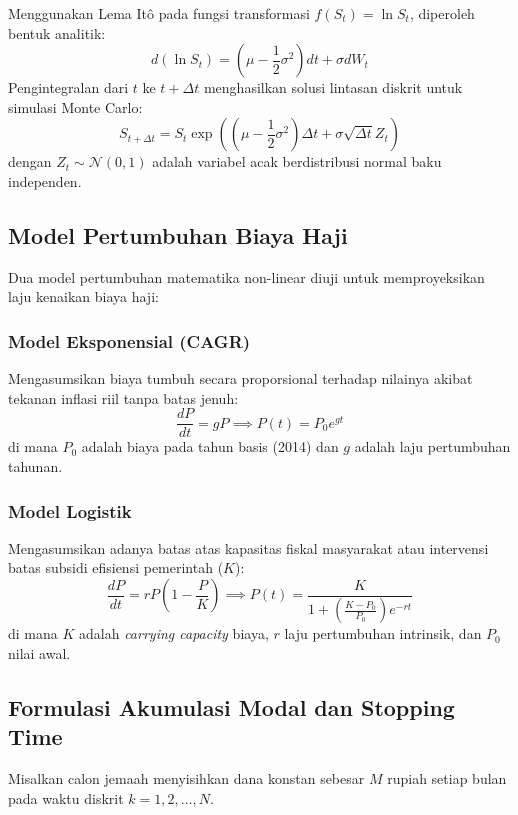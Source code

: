 \documentclass[journal,twoside]{IEEEtran}
\begin{document}
Menggunakan Lema It\^o pada fungsi transformasi $f(S_t) = \ln S_t$, diperoleh bentuk analitik:
\begin{equation}
d(\ln S_t) = \left( \mu - \frac{1}{2}\sigma^2 \right) dt + \sigma dW_t \label{eq:ito_log}
\end{equation}
Pengintegralan dari $t$ ke $t + \Delta t$ menghasilkan solusi lintasan diskrit untuk simulasi Monte Carlo:
\begin{equation}
S_{t+\Delta t} = S_t \exp\left( \left(\mu - \frac{1}{2}\sigma^2\right)\Delta t + \sigma \sqrt{\Delta t} Z_t \right) \label{eq:gbm_discrete}
\end{equation}
dengan $Z_t \sim \mathcal{N}(0, 1)$ adalah variabel acak berdistribusi normal baku independen.

\subsection{Model Pertumbuhan Biaya Haji}
Dua model pertumbuhan matematika non-linear diuji untuk memproyeksikan laju kenaikan biaya haji:

\subsubsection{Model Eksponensial (CAGR)}
Mengasumsikan biaya tumbuh secara proporsional terhadap nilainya akibat tekanan inflasi riil tanpa batas jenuh:
\begin{equation}
\frac{dP}{dt} = g P \implies P(t) = P_0 e^{g t} \label{eq:exp_model}
\end{equation}
di mana $P_0$ adalah biaya pada tahun basis (2014) dan $g$ adalah laju pertumbuhan tahunan.

\subsubsection{Model Logistik}
Mengasumsikan adanya batas atas kapasitas fiskal masyarakat atau intervensi batas subsidi efisiensi pemerintah ($K$):
\begin{equation}
\frac{dP}{dt} = r P \left( 1 - \frac{P}{K} \right) \implies P(t) = \frac{K}{1 + \left( \frac{K - P_0}{P_0} \right) e^{-rt}} \label{eq:log_model}
\end{equation}
di mana $K$ adalah \textit{carrying capacity} biaya, $r$ laju pertumbuhan intrinsik, dan $P_0$ nilai awal.

\subsection{Formulasi Akumulasi Modal dan Stopping Time}
Misalkan calon jemaah menyisihkan dana konstan sebesar $M$ rupiah setiap bulan pada waktu diskrit $k = 1, 2, \dots, N$.
\end{document}
